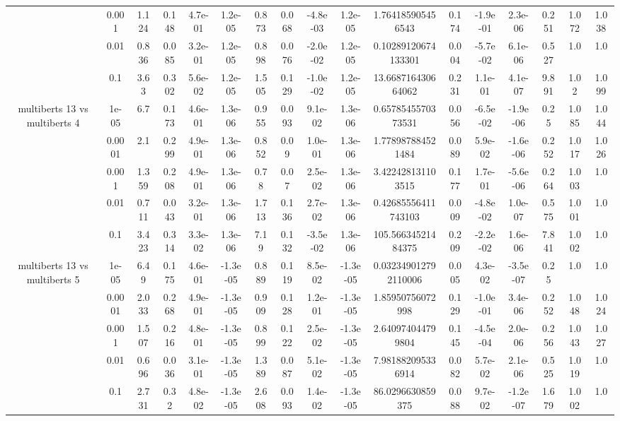 \begin{tabular}{|c|c|c|c|c|c|c|c|c|c|c|c|c|c|c|c|c|}
 & 0.001 & 1.124 & 0.148 & 4.7e-01 & 1.2e-05 & 0.873 & 0.068 & -4.8e-03 & 1.2e-05 & 1.764185905456543 & 0.174 & -1.9e-01 & 2.3e-06 & 0.251 & 1.072 & 1.038 \\
 & 0.01 & 0.836 & 0.085 & 3.2e-01 & 1.2e-05 & 0.898 & 0.076 & -2.0e-02 & 1.2e-05 & 0.10289120674133301 & 0.004 & -5.7e-02 & 6.1e-06 & 0.527 & 1.0 & 1.0 \\
 & 0.1 & 3.63 & 0.302 & 5.6e-02 & 1.2e-05 & 1.505 & 0.129 & -1.0e-02 & 1.2e-05 & 13.668716430664062 & 0.231 & 1.1e-01 & 4.1e-07 & 9.891 & 1.02 & 1.099 \\
\hline
\multirow{5}{*}{multiberts 13 vs multiberts 4} & 1e-05 & 6.7 & 0.173 & 4.6e-01 & 1.3e-06 & 0.955 & 0.093 & 9.1e-02 & 1.3e-06 & 0.6578545570373531 & 0.056 & -6.5e-02 & -1.9e-06 & 0.25 & 1.085 & 1.044 \\
 & 0.0001 & 2.1 & 0.299 & 4.9e-01 & 1.3e-06 & 0.852 & 0.09 & 1.0e-01 & 1.3e-06 & 1.778987884521484 & 0.089 & 5.9e-02 & -1.6e-06 & 0.252 & 1.017 & 1.026 \\
 & 0.001 & 1.359 & 0.208 & 4.9e-01 & 1.3e-06 & 0.78 & 0.07 & 2.5e-02 & 1.3e-06 & 3.422428131103515 & 0.177 & 1.7e-01 & -5.6e-06 & 0.264 & 1.003 & 1.0 \\
 & 0.01 & 0.711 & 0.043 & 3.2e-01 & 1.3e-06 & 1.713 & 0.136 & 2.7e-02 & 1.3e-06 & 0.42685556411743103 & 0.009 & -4.8e-02 & 1.0e-07 & 0.575 & 1.001 & 1.0 \\
 & 0.1 & 3.423 & 0.314 & 3.3e-02 & 1.3e-06 & 7.19 & 0.132 & -3.5e-02 & 1.3e-06 & 105.56634521484375 & 0.209 & -2.2e-02 & 1.6e-06 & 7.841 & 1.002 & 1.0 \\
\hline
\multirow{5}{*}{multiberts 13 vs multiberts 5} & 1e-05 & 6.49 & 0.175 & 4.6e-01 & -1.3e-05 & 0.889 & 0.119 & 8.5e-02 & -1.3e-05 & 0.032349012792110006 & 0.005 & 4.3e-02 & -3.5e-07 & 0.25 & 1.0 & 1.0 \\
 & 0.0001 & 2.033 & 0.268 & 4.9e-01 & -1.3e-05 & 0.909 & 0.128 & 1.2e-01 & -1.3e-05 & 1.85950756072998 & 0.129 & -1.0e-01 & 3.4e-06 & 0.252 & 1.048 & 1.024 \\
 & 0.001 & 1.507 & 0.216 & 4.8e-01 & -1.3e-05 & 0.899 & 0.122 & 2.5e-02 & -1.3e-05 & 2.640974044799804 & 0.145 & -4.5e-04 & 2.0e-06 & 0.256 & 1.043 & 1.027 \\
 & 0.01 & 0.696 & 0.036 & 3.1e-01 & -1.3e-05 & 1.389 & 0.087 & 5.1e-02 & -1.3e-05 & 7.981882095336914 & 0.082 & 5.7e-02 & 2.1e-06 & 0.525 & 1.019 & 1.0 \\
 & 0.1 & 2.731 & 0.32 & 4.8e-02 & -1.3e-05 & 2.608 & 0.093 & 1.4e-02 & -1.3e-05 & 86.0296630859375 & 0.088 & 9.7e-02 & -1.2e-07 & 1.679 & 1.002 & 1.0 \\

\end{tabular}
